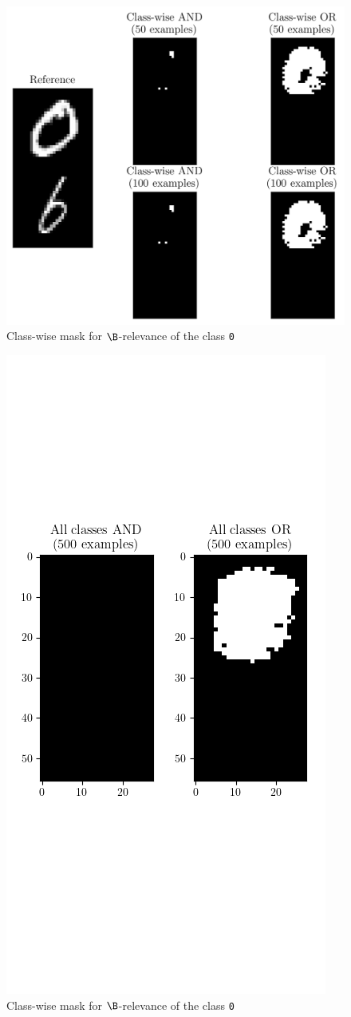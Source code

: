 \documentclass{../cs-classes/cs-classes}
\newcommand*{\1}{\digitsbb{1}}
\newcommand*{\0}{\digitsbb{0}}
\begin{document}
\begin{figure}[H]
    \centering
    \includegraphics[width=.5\textwidth]{dmnist-boolean-mask.png}
    \caption{Class-wise mask for $\B$-relevance of the class \texttt{0}}
\end{figure}

\begin{figure}[H]
    \centering
    \includegraphics[width=.5\textwidth]{dmnist-all-classes.png}
    \caption{Class-wise mask for $\B$-relevance of the class \texttt{0}}
\end{figure}


\end{document}
